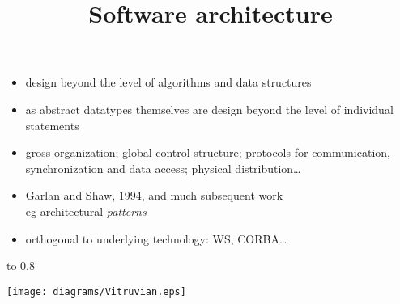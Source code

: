 \documentclass{sepslide-soa-faked} %
\title{Software architecture}
\begin{document}
\begin{slide}
  \Title
\end{slide}

\begin{slide}
  \Contents
\end{slide}

\begin{slide}
  \begin{itemize}
  \item design beyond the level of algorithms and data structures
  \item as abstract datatypes themselves are design beyond the level
    of individual statements
  \item gross organization; global control structure; protocols for
    communication, synchronization and data access; physical
    distribution\ldots 
  \item Garlan and Shaw, 1994, and much subsequent work \\
    eg architectural \emph{patterns}
  \item orthogonal to underlying technology: WS, CORBA\ldots
  \end{itemize}
\end{slide}

\begin{slide}
\begin{minipage}{0.6\textwidth} \raggedright
\vbox to 0.8
\end{minipage}\quad\begin{minipage}{0.35\textwidth}
\texttt{[image: diagrams/Vitruvian.eps]}
\end{minipage}
\end{slide}
\end{document}
